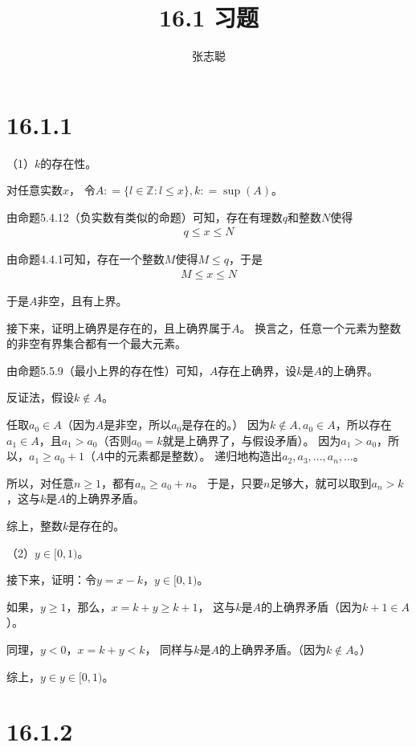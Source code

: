 \documentclass{article}
\begin{document}
\title{16.1 习题}
\author{张志聪}
\maketitle

\section*{16.1.1}

（1）$k$的存在性。

对任意实数$x$，
令$A : = \{l \in \mathbb{Z}: l \leq x\}, k: = \sup(A)$。

由命题5.4.12（负实数有类似的命题）可知，存在有理数$q$和整数$N$使得
\begin{align*}
  q \leq x \leq N
\end{align*}

由命题4.4.1可知，存在一个整数$M$使得$M \leq q$，于是
\begin{align*}
  M \leq x \leq N
\end{align*}

于是$A$非空，且有上界。

接下来，证明上确界是存在的，且上确界属于$A$。
换言之，任意一个元素为整数的非空有界集合都有一个最大元素。

由命题5.5.9（最小上界的存在性）可知，$A$存在上确界，设$k$是$A$的上确界。

反证法，假设$k \notin A$。

任取$a_0 \in A$（因为$A$是非空，所以$a_0$是存在的。）
因为$k \notin A, a_0 \in A$，所以存在$a_1 \in A$，且$a_1 > a_0$（否则$a_0 = k$就是上确界了，与假设矛盾）。
因为$a_1 > a_0$，所以，$a_1 \geq a_0 + 1$（$A$中的元素都是整数）。
递归地构造出$a_2, a_3, \dots, a_n, \dots$。

所以，对任意$n \geq 1$，都有$a_n \geq a_0 + n$。
于是，只要$n$足够大，就可以取到$a_n > k$，这与$k$是$A$的上确界矛盾。

综上，整数$k$是存在的。

（2）$y \in [0, 1)$。

接下来，证明：令$y = x - k$，$y \in [0, 1)$。

如果，$y \geq 1$，那么，$x = k + y \geq k + 1$，
这与$k$是$A$的上确界矛盾（因为$k + 1 \in A$）。

同理，$y < 0$，$x = k + y < k$，
同样与$k$是$A$的上确界矛盾。（因为$k \notin A$。）

综上，$y \in y \in [0, 1)$。

\section*{16.1.2}
\end{document}
